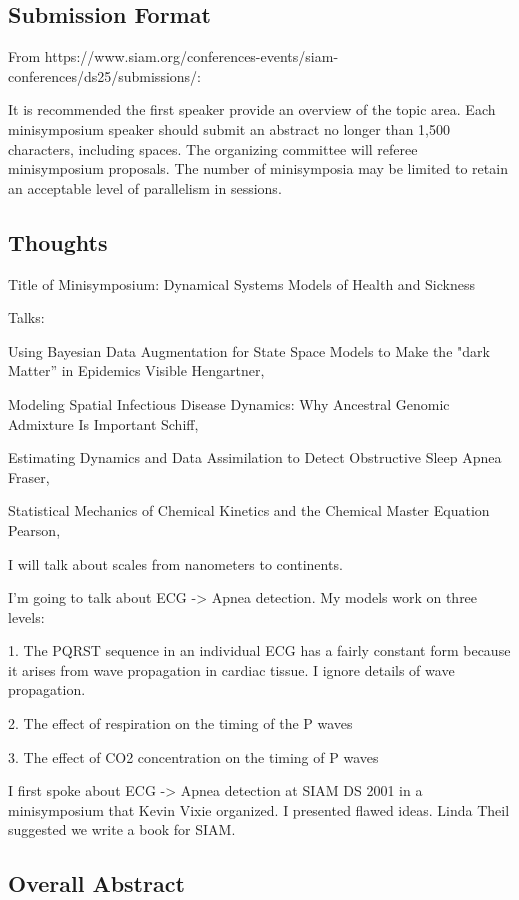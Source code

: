 \documentclass{article}
\begin{document}
\subsection*{Submission Format}
\label{SIAM}
From
https://www.siam.org/conferences-events/siam-conferences/ds25/submissions/:

It is recommended the first speaker provide an overview of the topic
area. Each minisymposium speaker should submit an abstract no longer
than 1,500 characters, including spaces. The organizing committee will
referee minisymposium proposals. The number of minisymposia may be
limited to retain an acceptable level of parallelism in sessions.

\subsection*{Thoughts}
\label{thoughts}

Title of Minisymposium: Dynamical Systems Models of Health and
Sickness

Talks:

Using Bayesian Data Augmentation for State Space Models to Make the
"dark Matter” in Epidemics Visible Hengartner,

Modeling Spatial Infectious Disease Dynamics: Why Ancestral Genomic
Admixture Is Important Schiff,

Estimating Dynamics and Data Assimilation to Detect Obstructive Sleep
Apnea Fraser,

Statistical Mechanics of Chemical Kinetics and the Chemical Master
Equation Pearson,


I will talk about scales from nanometers to continents.

I'm going to talk about ECG -> Apnea detection.  My models work on
three levels:

1. The PQRST sequence in an individual ECG has a fairly constant form
because it arises from wave propagation in cardiac tissue.  I ignore
details of wave propagation.

2. The effect of respiration on the timing of the P waves

3. The effect of CO2 concentration on the timing of P waves

I first spoke about ECG -> Apnea detection at SIAM DS 2001 in a
minisymposium that Kevin Vixie organized.  I presented flawed ideas.
Linda Theil suggested we write a book for SIAM.

\subsection*{Overall Abstract}
\label{overall}
\end{document}
